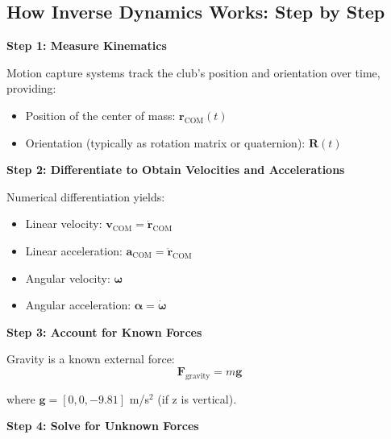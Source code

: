 \documentclass[11pt,a4paper]{article}
\newcommand{\bvec}[1]{\mathbf{#1}}
\theoremstyle{definition}
\theoremstyle{plain}
\begin{document}
\subsection{How Inverse Dynamics Works: Step by Step}

\textbf{Step 1: Measure Kinematics}

\vspace{3mm}

Motion capture systems track the club's position and orientation over time, providing:
\begin{itemize}
    \item Position of the center of mass: $\bvec{r}_{\text{COM}}(t)$
    \item Orientation (typically as rotation matrix or quaternion): $\bvec{R}(t)$
\end{itemize}

\vspace{3mm}

\textbf{Step 2: Differentiate to Obtain Velocities and Accelerations}

\vspace{3mm}

Numerical differentiation yields:
\begin{itemize}
    \item Linear velocity: $\bvec{v}_{\text{COM}} = \dot{\bvec{r}}_{\text{COM}}$
    \item Linear acceleration: $\bvec{a}_{\text{COM}} = \ddot{\bvec{r}}_{\text{COM}}$
    \item Angular velocity: $\bvec{\omega}$
    \item Angular acceleration: $\bvec{\alpha} = \dot{\bvec{\omega}}$
\end{itemize}

\vspace{3mm}

\textbf{Step 3: Account for Known Forces}

\vspace{3mm}

Gravity is a known external force:
\begin{equation}
\bvec{F}_{\text{gravity}} = m\bvec{g}
\end{equation}

where $\bvec{g} = [0, 0, -9.81]$ m/s$^2$ (if z is vertical).

\vspace{3mm}

\textbf{Step 4: Solve for Unknown Forces}

\vspace{3mm}
\end{document}
